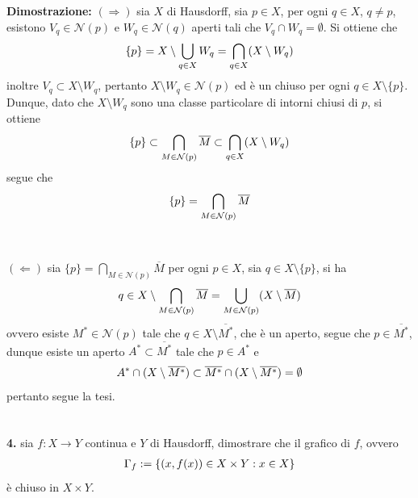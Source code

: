 \documentclass{article}
\begin{document}
\textbf{Dimostrazione:} $(\Rightarrow)$ sia $X$ di Hausdorff, sia $p \in X$, per ogni $q \in X$, $q \neq p$, esistono $V_q \in \mathcal{N}(p)$ e $W_q \in \mathcal{N}(q)$ aperti tali che $V_q \cap W_q = \emptyset$. Si ottiene che
\begin{gather}
    \{ p \} = X \setminus \bigcup_{q \in X} W_q = \bigcap_{q \in X} (X \setminus W_q) \notag
\end{gather}
inoltre $V_q \subset X \setminus W_q$, pertanto $X \setminus W_q \in \mathcal{N}(p)$ ed è un chiuso per ogni $q \in X \setminus \{ p \}$. Dunque, dato che $X \setminus W_q$ sono una classe particolare di intorni chiusi di $p$, si ottiene
\begin{gather}
    \{ p \} \subset \bigcap_{M \in \mathcal{N}(p)} \overline{M} \subset \bigcap_{q \in X} (X \setminus W_q) \notag
\end{gather}
segue che
\begin{gather}
    \{ p \} = \bigcap_{M \in \mathcal{N}(p)} \overline{M} \notag
\end{gather} \\ \\
$(\Leftarrow)$ sia $\{ p \} = \bigcap_{M \in \mathcal{N}(p)} \overline{M}$ per ogni $p \in X$, sia $q \in X \setminus \{ p \}$, si ha
\begin{gather}
    q \in X \setminus \bigcap_{M \in \mathcal{N}(p)} \overline{M} = \bigcup_{M \in \mathcal{N}(p)} (X \setminus \overline{M}) \notag
\end{gather}
ovvero esiste $M^* \in \mathcal{N}(p)$ tale che $q \in X \setminus \overline{M^*}$, che è un aperto, segue che $p \in \overline{M^*}$, dunque esiste un aperto $A^* \subset \overline{M^*}$ tale che $p \in A^*$ e
\begin{gather}
    A^* \cap (X \setminus \overline{M^*}) \subset \overline{M^*} \cap (X \setminus \overline{M^*}) = \emptyset \notag
\end{gather}
pertanto segue la tesi. \\ \\ \\
\textbf{4.} sia $f : X \longrightarrow Y$ continua e $Y$ di Hausdorff, dimostrare che il grafico di $f$, ovvero
\begin{gather}
    \Gamma_f := \{ (x, f(x)) \in X \times Y : x \in X \} \notag
\end{gather}
è chiuso in $X \times Y$. \\
\end{document}
